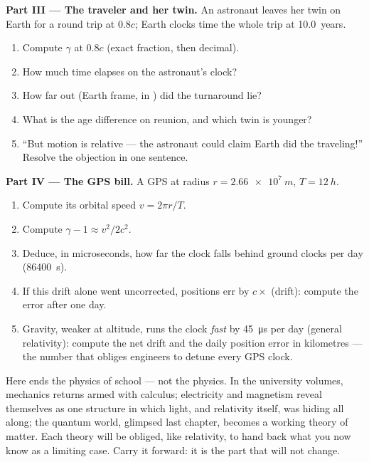\begin{problem}
\medskip
\noindent\textbf{Part III --- The traveler and her twin.}
An astronaut leaves her twin on Earth for a round trip at $0.8c$; Earth
clocks time the whole trip at \qty{10.0}{years}.
\begin{enumerate}[resume]
  \item Compute $\gamma$ at $0.8c$ (exact fraction, then decimal).
  \item How much time elapses on the astronaut's clock?
  \item How far out (Earth frame, in ) did the turnaround lie?
  \item What is the age difference on reunion, and which twin is younger?
  \item ``But motion is relative --- the astronaut could claim Earth did
        the traveling!'' Resolve the objection in one sentence.
\end{enumerate}

\medskip
\noindent\textbf{Part IV --- The GPS bill.}
A GPS   at radius $r = \qty{2.66e7}{m}$,  $T = \qty{12}{h}$.
\begin{enumerate}[resume]
  \item Compute its orbital speed $v = 2\pi r/T$.
  \item Compute $\gamma - 1 \approx v^2/2c^2$.
  \item Deduce, in microseconds, how far the  clock falls behind
        ground clocks per day (\qty{86400}{s}).
  \item If this drift alone went uncorrected, positions err by
        $c \times$ (drift): compute the error after one day.
  \item Gravity, weaker at altitude, runs the clock \emph{fast} by
        \qty{45}{\micro s} per day (general relativity): compute the net
        drift and the daily position error in kilometres --- the number
        that obliges engineers to detune every GPS clock.
\end{enumerate}
\end{problem}

\bigskip
\noindent
Here ends the physics of school --- not the physics. In the university
volumes, mechanics returns armed with calculus; electricity and magnetism
reveal themselves as one structure in which light, and relativity itself,
was hiding all along; the quantum world, glimpsed last chapter, becomes a
working theory of matter. Each theory will be obliged, like relativity, to
hand back what you now know as a limiting case. Carry it forward: it is
the part that will not change.
